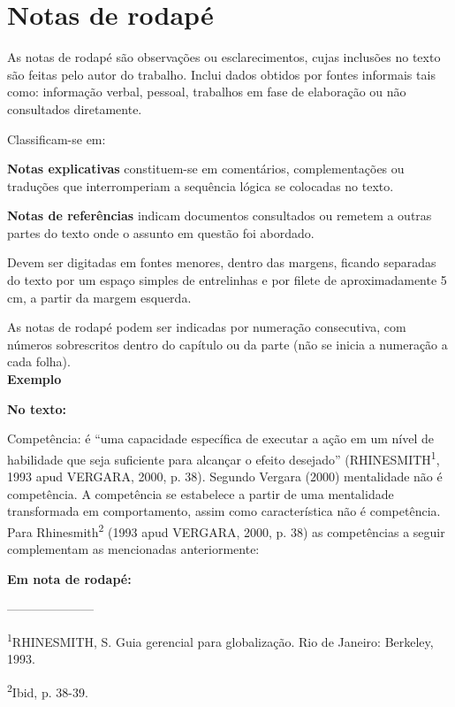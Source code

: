 \section{Notas de rodapé}
As notas de rodapé são observações ou esclarecimentos, cujas inclusões no texto são feitas pelo autor do trabalho. Inclui dados obtidos por fontes informais tais como: informação verbal, pessoal, trabalhos em fase de elaboração ou não consultados diretamente.

\newpage

Classificam-se em:\\
\begin{alineas}
\item
\textbf{Notas explicativas} constituem-se em comentários, complementações ou traduções que interromperiam a sequência lógica se colocadas no texto. \cite{Soares2002}

\item
\textbf{Notas de referências} indicam documentos consultados ou remetem a outras partes do texto onde o assunto em questão foi abordado. \\
\end{alineas}

Devem ser digitadas em fontes menores, dentro das margens, ficando separadas do texto por um espaço simples de entrelinhas e por filete de aproximadamente 5 cm, a partir da margem esquerda.

As notas de rodapé podem ser indicadas por numeração consecutiva, com números sobrescritos dentro do capítulo ou da parte (não se inicia a numeração a cada folha).\\

\textbf{Exemplo}

\begin{alineas}

\item

\textbf{No texto:}

Competência: é “uma capacidade específica de executar a ação em um nível de habilidade que seja suficiente para alcançar o efeito desejado” (RHINESMITH\textsuperscript{1}, 1993 apud VERGARA, 2000, p. 38).
Segundo Vergara (2000) mentalidade não é competência. A competência se estabelece a partir de uma mentalidade transformada em comportamento, assim como característica não é competência.
Para Rhinesmith\textsuperscript{2} (1993 apud VERGARA, 2000, p. 38) as competências a seguir complementam as mencionadas anteriormente:

\textbf{Em nota de rodapé:}

---------------------

\textsuperscript{1}RHINESMITH, S. Guia gerencial para globalização. Rio de Janeiro: Berkeley, 1993.

\textsuperscript{2}Ibid, p. 38-39.


\end{alineas}

